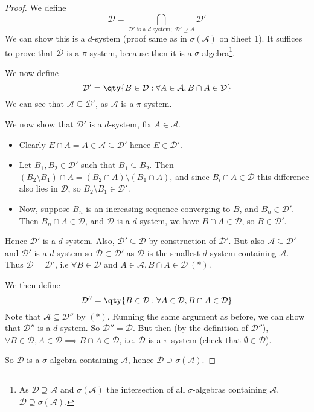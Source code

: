\begin{proof}
	We define
	\[ \mathcal D = \bigcap_{\mathcal D' \text{ is a } d \text{-system};\; \mathcal D' \supseteq \mathcal A} \mathcal D' \]
	We can show this is a $d$-system (proof same as in $\sigma(\mathcal{A})$ on Sheet 1).
	It suffices to prove that $\mathcal D$ is a $\pi$-system, because then it is a $\sigma$-algebra\footnote{As $\mathcal{D} \supseteq \mathcal{A}$ and $\sigma(\mathcal{A})$ the intersection of all $\sigma$-algebras containing $\mathcal{A}$, $\mathcal{D} \supseteq \sigma(\mathcal{A})$.}.

	We now define
	\[ \mathcal D' = \qty{B \in \mathcal D : \forall A \in \mathcal A, B \cap A \in \mathcal D} \]
	We can see that $\mathcal A \subseteq \mathcal{D}'$, as $\mathcal A$ is a $\pi$-system.

	We now show that $\mathcal D'$ is a $d$-system, fix $A \in \mathcal{A}$.
	\begin{itemize}
		\item Clearly $E \cap A = A \in \mathcal A \subseteq \mathcal D'$ hence $E \in \mathcal D'$.
		\item Let $B_1, B_2 \in \mathcal D'$ such that $B_1 \subseteq B_2$.
		Then $(B_2 \setminus B_1) \cap A = (B_2 \cap A) \setminus (B_1 \cap A)$, and since $B_i \cap A \in \mathcal D$ this difference also lies in $\mathcal D$, so $B_2 \setminus B_1 \in \mathcal D'$.
		\item Now, suppose $B_n$ is an increasing sequence converging to $B$, and $B_n \in \mathcal D'$.
		Then $B_n \cap A \in \mathcal D$, and $\mathcal D$ is a $d$-system, we have $B \cap A \in \mathcal D$, so $B \in \mathcal D'$.
	\end{itemize}

	Hence $\mathcal D'$ is a $d$-system.
	Also, $\mathcal D' \subseteq \mathcal D$ by construction of $\mathcal D'$.
	But also $\mathcal{A} \subseteq \mathcal{D}'$ and $\mathcal{D}'$ is a $d$-system so $\mathcal{D} \subset \mathcal{D}'$ as $\mathcal{D}$ is the smallest $d$-system containing $\mathcal{A}$.
	Thus $\mathcal D = \mathcal D'$, i.e $\forall B \in \mathcal{D}$ and $A \in \mathcal{A}, B \cap A \in \mathcal{D} \ (\ast)$.

	We then define
	\[ \mathcal D'' = \qty{B \in \mathcal D : \forall A \in \mathcal D, B \cap A \in \mathcal D} \]
	Note that $\mathcal A \subseteq \mathcal D''$ by $(\ast)$.
	Running the same argument as before, we can show that $\mathcal D''$ is a $d$-system. So $\mathcal{D}'' = \mathcal{D}$.
	But then (by the definition of $\mathcal{D}''$), $\forall B \in \mathcal{D}, A \in \mathcal{D} \implies B \cap A \in \mathcal{D}$, i.e. $\mathcal{D}$ is a $\pi$-system (check that $\emptyset \in \mathcal{D}$).

	So $\mathcal{D}$ is a $\sigma$-algebra containing $\mathcal{A}$, hence $\mathcal{D} \supseteq \sigma(\mathcal{A})$.
\end{proof}

